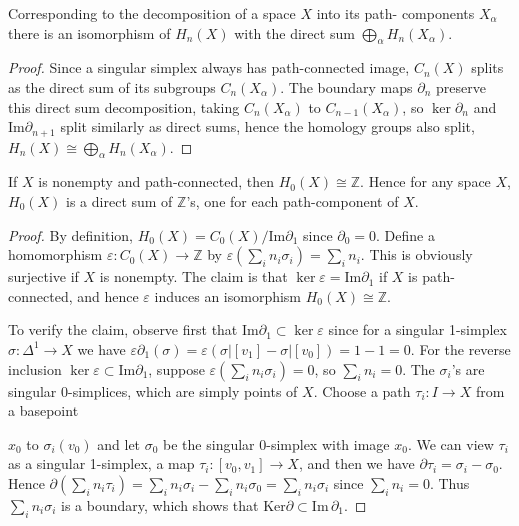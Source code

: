 \begin{proposition}
\label{prop:homology-disjoint-union}
Corresponding to the decomposition of a space $X$ into its path-
components $X_\alpha$ there is an isomorphism of $H_n(X)$ with the direct sum $\bigoplus_\alpha H_n(X_\alpha)$.
\end{proposition}
\begin{proof}
 Since a singular simplex always has path-connected image, $C_n(X)$ splits as the
direct sum of its subgroups $C_n(X_\alpha)$. The boundary maps $\partial_n$ preserve this direct sum
decomposition, taking $C_n(X_\alpha)$ to $C_{n-1}(X_\alpha)$, so $\ker\partial_n$ and $\text{Im}\partial_{n+1}$ split similarly as
direct sums, hence the homology groups also split, $H_n(X) \cong \bigoplus_\alpha H_n(X_\alpha)$.
\end{proof}
\begin{proposition}
\label{prop:h0-path-connected}
If $X$ is nonempty and path-connected, then $H_0(X) \cong \mathbb{Z}$. Hence for
any space $X$, $H_0(X)$ is a direct sum of $\mathbb{Z}$'s, one for each path-component of $X$.
\end{proposition}
\begin{proof}
 By definition, $H_0(X) = C_0(X) / \text{Im} \partial_1$ since $\partial_0 = 0$. Define a homomorphism
$\varepsilon : C_0(X) \to \mathbb{Z}$ by $\varepsilon(\sum_i n_i \sigma_i) = \sum_i n_i$. This is obviously surjective if $X$ is nonempty.
The claim is that $\ker \varepsilon = \text{Im} \partial_1$ if $X$ is path-connected, and hence $\varepsilon$ induces an isomorphism $H_0(X) \cong \mathbb{Z}$.

To verify the claim, observe first that $\text{Im} \partial_1 \subset \ker\varepsilon$ since for a singular 1-simplex
$\sigma:\Delta^1 \to X$ we have $\varepsilon \partial_1(\sigma) = \varepsilon(\sigma|[v_1] - \sigma|[v_0]) = 1 - 1 = 0$. For the reverse
inclusion $\ker\varepsilon \subset \text{Im}\partial_1$, suppose $\varepsilon(\sum_i n_i \sigma_i) = 0$, so $\sum_i n_i = 0$. The $\sigma_i$'s are singular
0-simplices, which are simply points of $X$. Choose a path $\tau_i : I \to X$ from a basepoint

$x_0$ to $\sigma_i(v_0)$ and let $\sigma_0$ be the singular 0-simplex with image $x_0$. We can view $\tau_i$
as a singular 1-simplex, a map $\tau_i:[v_0, v_1]\to X$, and then we have $\partial\tau_i = \sigma_i - \sigma_0$.
Hence $\partial(\sum_i n_i\tau_i) = \sum_i n_i\sigma_i - \sum_i n_i\sigma_0 = \sum_i n_i\sigma_i$ since $\sum_i n_i = 0$. Thus $\sum_i n_i\sigma_i$ is a
boundary, which shows that $\text{Ker}\partial \subset \text{Im}\,\partial_1$.
\end{proof}

